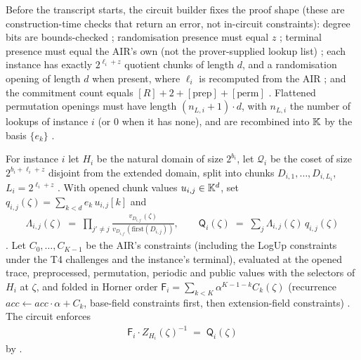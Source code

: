 Before the transcript starts, the circuit builder fixes the proof shape (these
are construction-time checks that return an error, not in-circuit constraints):
degree bits are
bounds-checked ; randomisation presence must equal
$z$ ; terminal presence must equal the AIR's
own  (not the prover-supplied lookup list)
; each instance has exactly $2^{\ell_i+z}$ quotient
chunks of length $d$, and a randomisation opening of length $d$ when present,
where $\ell_i$ is recomputed from the AIR ; and the
commitment count equals $[R] + 2 + [\text{prep}] + [\text{perm}]$
. Flattened permutation openings must have length
$(n_{L,i}+1)\cdot d$, with $n_{L,i}$ the number of lookups of instance $i$
(or $0$ when it has none), and are recombined into $\mathbb{K}$ by the basis
$\{e_k\}$ .

\begin{definition}
\label{def:ps-air-check}
For instance $i$ let $H_i$ be the natural domain of size $2^{b_i}$, let
$\mathcal{Q}_i$ be the coset of size $2^{b_i+\ell_i+z}$ disjoint from the extended
domain, split into chunks $D_{i,1},\dots,D_{i,L_i}$, $L_i = 2^{\ell_i+z}$
. With opened chunk values
$u_{i,j} \in \mathbb{K}^{d}$, set $q_{i,j}(\zeta) = \sum_{k<d} e_k\, u_{i,j}[k]$ and
\begin{align}
  \Lambda_{i,j}(\zeta) \;=\; \prod_{j'\ne j}
     \frac{v_{D_{i,j'}}(\zeta)}{v_{D_{i,j'}}(\mathrm{first}(D_{i,j}))},
  \qquad
  \mathsf{Q}_i(\zeta) \;=\; \sum_{j} \Lambda_{i,j}(\zeta)\, q_{i,j}(\zeta)
\end{align}
.
Let $C_0,\dots,C_{K-1}$ be the AIR's constraints (including the LogUp
constraints under the T4 challenges and the instance's terminal), evaluated at
the opened trace, preprocessed, permutation, periodic and public values with the
selectors of $H_i$ at $\zeta$, and folded in Horner order
$\mathsf{F}_i = \sum_{k<K} \alpha^{K-1-k} C_k(\zeta)$ (recurrence
$\mathit{acc} \leftarrow \mathit{acc}\cdot\alpha + C_k$, base-field constraints
first, then extension-field constraints)
. The circuit enforces
\begin{align}
  \mathsf{F}_i \cdot Z_{H_i}(\zeta)^{-1} \;=\; \mathsf{Q}_i(\zeta)
\end{align}
by  .
\end{definition}


